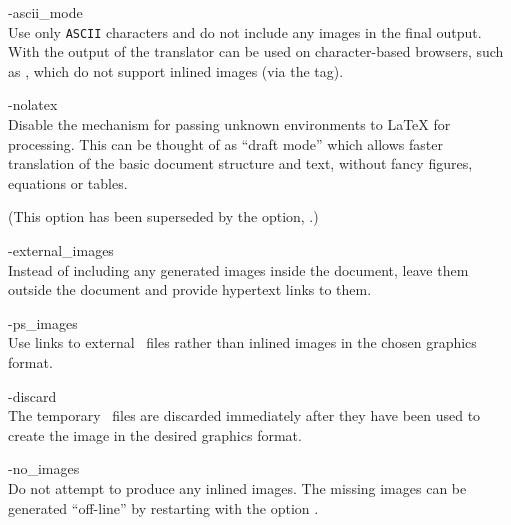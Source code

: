 \begin{htmllist}%
%
%
%
\item [ -ascii\_mode \label{asciimode}]
\\
Use only \texttt{ASCII} characters and do not include any images in the final output.
With  the output of the translator can be used on
character-based browsers, such as ,
which do not support inlined images (via the  tag).


%
\item [ -nolatex \label{nolatex}]
\\
Disable the mechanism for passing unknown environments to \LaTeX{} for processing.
This can be thought of as ``draft mode'' which allows
faster translation of the basic document structure and text,
without fancy figures, equations or tables.

(This option has been superseded by the  option,
.)


%
\item [ -external\_images\label{extimages}]
\\
Instead of including any generated images inside the document,
leave them outside the document and provide hypertext links to them.


%
\item [ -ps\_images\label{psimages}]
\\
Use links to external \PS\ files rather than inlined images
in the chosen graphics format.

%
\begin{changebar}
\item [ -discard\label{discard}]
\\
The temporary \PS\ files are discarded immediately after they
have been used to create the image in the desired graphics format.
\end{changebar}

%
\item [ -no\_images\label{noimages}]
\\
Do not attempt to produce any inlined images.
The missing images can be generated ``off-line'' by restarting \latextohtml{}
with the option .


\end{htmllist}
